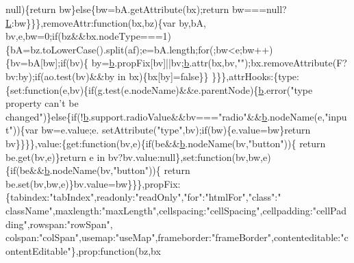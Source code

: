\begin{DoxyCode}
      null)\{\textcolor{keywordflow}{return} bw\}\textcolor{keywordflow}{else}\{bw=bA.getAttribute(bx);\textcolor{keywordflow}{return} bw===null?\hyperlink{jquery_8js_a38ee4c0b5f4fe2a18d0c783af540d253}{L}:bw\}\}\},removeAttr:\textcolor{keyword}{function}(bx,bz)\{var by,bA,
      bv,e,bw=0;\textcolor{keywordflow}{if}(bz&&bx.nodeType===1)\{bA=bz.toLowerCase().split(af);e=bA.length;\textcolor{keywordflow}{for}(;bw<e;bw++)\{bv=bA[bw];\textcolor{keywordflow}{if}(bv)\{
      by=\hyperlink{jquery_8js_aa4026ad5544b958e54ce5e106fa1c805}{b}.propFix[bv]||bv;\hyperlink{jquery_8js_aa4026ad5544b958e54ce5e106fa1c805}{b}.attr(bx,bv,\textcolor{stringliteral}{""});bx.removeAttribute(F?bv:by);\textcolor{keywordflow}{if}(ao.test(bv)&&by in bx)\{bx[by]=\textcolor{keyword}{false}\}\}
      \}\}\},attrHooks:\{type:\{\textcolor{keyword}{set}:\textcolor{keyword}{function}(e,bv)\{\textcolor{keywordflow}{if}(g.test(e.nodeName)&&e.parentNode)\{\hyperlink{jquery_8js_aa4026ad5544b958e54ce5e106fa1c805}{b}.error(\textcolor{stringliteral}{"type property can't
       be changed"})\}\textcolor{keywordflow}{else}\{\textcolor{keywordflow}{if}(!\hyperlink{jquery_8js_aa4026ad5544b958e54ce5e106fa1c805}{b}.support.radioValue&&bv===\textcolor{stringliteral}{"radio"}&&\hyperlink{jquery_8js_aa4026ad5544b958e54ce5e106fa1c805}{b}.nodeName(e,\textcolor{stringliteral}{"input"}))\{var bw=e.value;e.
      setAttribute(\textcolor{stringliteral}{"type"},bv);\textcolor{keywordflow}{if}(bw)\{e.value=bw\}\textcolor{keywordflow}{return} bv\}\}\}\},value:\{\textcolor{keyword}{get}:\textcolor{keyword}{function}(bv,e)\{\textcolor{keywordflow}{if}(be&&\hyperlink{jquery_8js_aa4026ad5544b958e54ce5e106fa1c805}{b}.nodeName(bv,\textcolor{stringliteral}{"button"}))\{\textcolor{keywordflow}{
      return} be.get(bv,e)\}\textcolor{keywordflow}{return} e in bv?bv.value:null\},\textcolor{keyword}{set}:\textcolor{keyword}{function}(bv,bw,e)\{\textcolor{keywordflow}{if}(be&&\hyperlink{jquery_8js_aa4026ad5544b958e54ce5e106fa1c805}{b}.nodeName(bv,\textcolor{stringliteral}{"button"}))\{\textcolor{keywordflow}{
      return} be.set(bv,bw,e)\}bv.value=bw\}\}\},propFix:\{tabindex:\textcolor{stringliteral}{"tabIndex"},readonly:\textcolor{stringliteral}{"readOnly"},\textcolor{stringliteral}{"for"}:\textcolor{stringliteral}{"htmlFor"},\textcolor{stringliteral}{"class"}:\textcolor{stringliteral}{"
      className"},maxlength:\textcolor{stringliteral}{"maxLength"},cellspacing:\textcolor{stringliteral}{"cellSpacing"},cellpadding:\textcolor{stringliteral}{"cellPadding"},rowspan:\textcolor{stringliteral}{"rowSpan"},
      colspan:\textcolor{stringliteral}{"colSpan"},usemap:\textcolor{stringliteral}{"useMap"},frameborder:\textcolor{stringliteral}{"frameBorder"},contenteditable:\textcolor{stringliteral}{"contentEditable"}\},prop:\textcolor{keyword}{function}(bz,bx

\end{DoxyCode}
